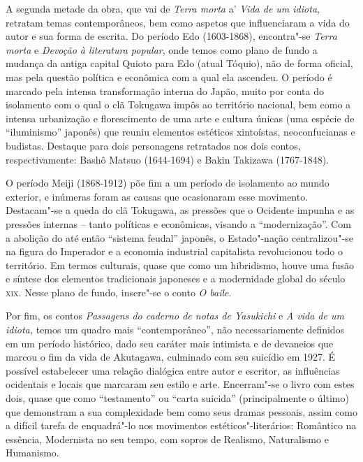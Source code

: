 \documentclass[12pt]{extarticle}
\begin{document}
A segunda metade da obra, que vai de \emph{Terra morta} a' \emph{Vida de um
idiota}, retratam temas contemporâneos, bem como aspetos que influenciaram a
vida do autor e sua forma de escrita. Do período Edo (1603-1868), encontra"-se
\emph{Terra morta} e \emph{Devoção à literatura popular}, onde temos como plano
de fundo a mudança da antiga capital Quioto para Edo (atual Tóquio), não de
forma oficial, mas pela questão política e econômica com a qual ela ascendeu. O
período é marcado pela intensa transformação interna do Japão, muito por conta
do isolamento com o qual o clã Tokugawa impôs ao território nacional, bem como
a intensa urbanização e florescimento de uma arte e cultura únicas (uma espécie
de ``iluminismo'' japonês) que reuniu elementos estéticos xintoístas,
neoconfucianas e budistas. Destaque para dois personagens retratados nos dois
contos, respectivamente: Bashô Matsuo (1644-1694) e Bakin Takizawa (1767-1848).

O período Meiji (1868-1912) põe fim a um período de isolamento ao mundo
exterior, e inúmeras foram as causas que ocasionaram esse movimento.
Destacam"-se a queda do clã Tokugawa, as pressões que o Ocidente impunha e as
pressões internas -- tanto políticas e econômicas, visando a ``modernização''.
Com a abolição do até então ``sistema feudal'' japonês, o Estado"-nação
centralizou"-se na figura do Imperador e a economia industrial capitalista
revolucionou todo o território. Em termos culturais, quase que como um
hibridismo, houve uma fusão e síntese dos elementos tradicionais japoneses e a
modernidade global do século \textsc{xix}. Nesse plano de fundo, insere"-se o
conto \emph{O baile}.

Por fim, os contos \emph{Passagens do caderno de notas de Yasukichi} e \emph{A
vida de um idiota,} temos um quadro mais ``contemporâneo'', não necessariamente
definidos em um período histórico, dado seu caráter mais intimista e de
devaneios que marcou o fim da vida de Akutagawa, culminado com seu suicídio em
1927. É possível estabelecer uma relação dialógica entre autor e escritor, as
influências ocidentais e locais que marcaram seu estilo e arte. Encerram"-se o
livro com estes dois, quase que como ``testamento'' ou ``carta suicida''
(principalmente o último) que demonstram a sua complexidade bem como seus
dramas pessoais, assim como a difícil tarefa de enquadrá"-lo nos movimentos
estéticos"-literários: Romântico na essência, Modernista no seu tempo, com
sopros de Realismo, Naturalismo e Humanismo.
\end{document}
